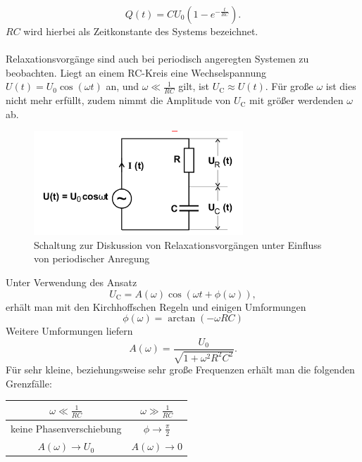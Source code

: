 \begin{equation}
  \label{eqn:entladung}
  Q(t)=CU_\text{0}(  1-e^{-\frac{t}{RC}} ) .
\end{equation}
$RC$ wird hierbei als Zeitkonstante des Systems bezeichnet.\\
\\Relaxationsvorgänge sind auch bei periodisch angeregten Systemen zu beobachten.
Liegt an einem RC-Kreis eine Wechselspannung $U(t)=U_\text{0}\cos(\omega t)$ an, und $\omega \ll \frac{1}{RC}$ gilt, ist $U_\text{C} \approx U(t)$.
Für große $\omega$ ist dies nicht mehr erfüllt, zudem nimmt die Amplitude von $U_\text{C}$ mit größer werdenden $\omega$ ab.
\begin{figure}
  \centering
  \includegraphics[width=0.7\textwidth]{bilder/periodisch.png}
  \caption{Schaltung zur Diskussion von Relaxationsvorgängen unter Einfluss von periodischer Anregung \cite{Anleitung}}
  \label{fig:periodisch}
\end{figure}
Unter Verwendung des Ansatz
\begin{equation*}
U_\text{C}=A(\omega)\cos(\omega t +\phi(\omega)) ,
\end{equation*}
erhält man mit den Kirchhoffschen Regeln und einigen Umformungen
\begin{equation}
\phi(\omega)=\arctan(-\omega RC)
\end{equation}
Weitere Umformungen liefern
\begin{equation}
A(\omega)=\frac{U_\text{0}}{\sqrt{1+\omega ^2R^2C^2}} .
\end{equation}
Für sehr kleine, beziehungsweise sehr große Frequenzen erhält man die folgenden Grenzfälle:

\begin{table}
\centering
  \label{tab:tab1}
  \begin{tabular}{cc}

    $\omega \ll \frac{1}{RC} $&  $ \omega \gg \frac{1}{RC}$ \\
    \midrule
    keine Phasenverschiebung & $\phi \to \frac{\pi}{2}$\\
    $A(\omega) \to U_\text{0} $ & $A(\omega) \to 0$\\
  \end{tabular}
\end{table}

